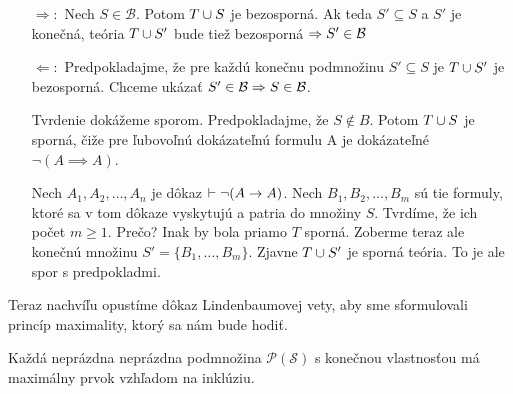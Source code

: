 \begin{dokaz}
   \begin{itemize}
       \item[$\Rightarrow:$]
            Nech $S \in \mathcal{B}$. Potom $T \cup S$ je bezosporná.
            Ak teda $S' \subseteq S$ a  $S'$ je konečná, teória 
            $T \cup S'$ bude tiež bezosporná $\Rightarrow S' \in \mathcal{B}$
        \item[$\Leftarrow:$]
            Predpokladajme, že pre každú konečnu podmnožinu $S' \subseteq S$
            je $T \cup S'$ je bezosporná.
            Chceme ukázať $S' \in \mathcal{B} \Rightarrow S \in \mathcal{B}$.

            Tvrdenie dokážeme sporom.
            Predpokladajme, že $S \not \in B$.
            Potom $T \cup S$ je sporná,
            čiže pre ľubovoľnú dokázateľnú formulu A je dokázateľné
            $\neg(A \implies A)$.

            Nech $A_1, A_2, \dots, A_n$ je dôkaz 
                $\vdash \neg(A \rightarrow A)$.
            Nech $B_1, B_2, \dots, B_m$ sú tie formuly,
            ktoré sa v tom dôkaze vyskytujú a patria do množiny $S$.
            Tvrdíme, že ich počet $m \ge 1$.
            Prečo? Inak by bola priamo $T$ sporná.
            Zoberme teraz ale konečnú množinu $S'=\{B_1, \dots, B_m\}$.
            Zjavne $T \cup S'$ je sporná teória.
            To je ale spor s predpokladmi.
    \end{itemize}

    Teraz nachvíľu opustíme dôkaz Lindenbaumovej vety, aby sme
    sformulovali princíp maximality, ktorý sa nám bude hodiť.
    \end{dokaz}

    \begin{lema}
        Každá neprázdna neprázdna podmnožina $\mathcal{P}(\mathscr{S})$ s konečnou vlastnosťou 
        má maximálny prvok vzhľadom na inklúziu.
    \end{lema}

